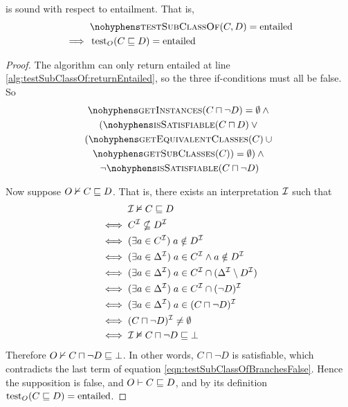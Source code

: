 \documentclass[paper.tex]{subfiles}
\begin{document}
\begin{lemma}
   is sound with respect to entailment.  That is,
  \begin{align*}
    & \textproc{testSubClassOf}(C, D) = \mathrm{entailed} \\
    \implies{}& \test_O(C \sqsubseteq D) = \mathrm{entailed}
  \end{align*}
\end{lemma}
\begin{proof}
  The algorithm can only return entailed at line \ref{alg:testSubClassOf:returnEntailed}, so the three if-conditions must all be false.  So
  \begin{multline}
    \label{eqn:testSubClassOfBranchesFalse}
    \textproc{getInstances}(C \sqcap \neg D) = \emptyset \land {} \\
    (\textproc{isSatisfiable}(C \sqcap D) \lor {} \\
    (\textproc{getEquivalentClasses}(C) \union {} \\
    \textproc{getSubClasses}(C)) = \emptyset) \land {} \\
    \lnot \textproc{isSatisfiable}(C \sqcap \neg D)
  \end{multline}


  Now suppose $O \nvdash C \sqsubseteq D$.  That is, there exists an interpretation $\mathcal{I}$ such that
  \begin{align*}
    & \mathcal{I} \nvDash C \sqsubseteq D \\
    \iff{}& C^{\mathcal{I}} \nsubseteq D^{\mathcal{I}} \\
    \iff{}& (\exists a \in C^{\mathcal{I}}) \; a \notin D^{\mathcal{I}} \\
    \iff{}& (\exists a \in \Delta^{\mathcal{I}}) \; a \in C^{\mathcal{I}} \land a \notin D^{\mathcal{I}} \\
    \iff{}& (\exists a \in \Delta^{\mathcal{I}}) \; a \in C^{\mathcal{I}} \cap (\Delta^{\mathcal{I}} \setminus D^{\mathcal{I}}) \\
    \iff{}& (\exists a \in \Delta^{\mathcal{I}}) \; a \in C^{\mathcal{I}} \cap (\neg D)^{\mathcal{I}} \\
    \iff{}& (\exists a \in \Delta^{\mathcal{I}}) \; a \in (C \sqcap \neg D)^{\mathcal{I}} \\
    \iff{}& (C \sqcap \neg D)^{\mathcal{I}} \ne \emptyset \\
    \iff{}& \mathcal{I} \nvDash C \sqcap \neg D \sqsubseteq \bot
  \end{align*}
  Therefore $O \nvdash C \sqcap \neg D \sqsubseteq \bot$.  In other words, $C \sqcap \neg D$ is satisfiable, which contradicts the last term of equation \ref{eqn:testSubClassOfBranchesFalse}.  Hence the supposition is false, and $O \vdash C \sqsubseteq D$, and by its definition $\operatorname{test}_O(C \sqsubseteq D) = \mathrm{entailed}$.
\end{proof}
\end{document}
